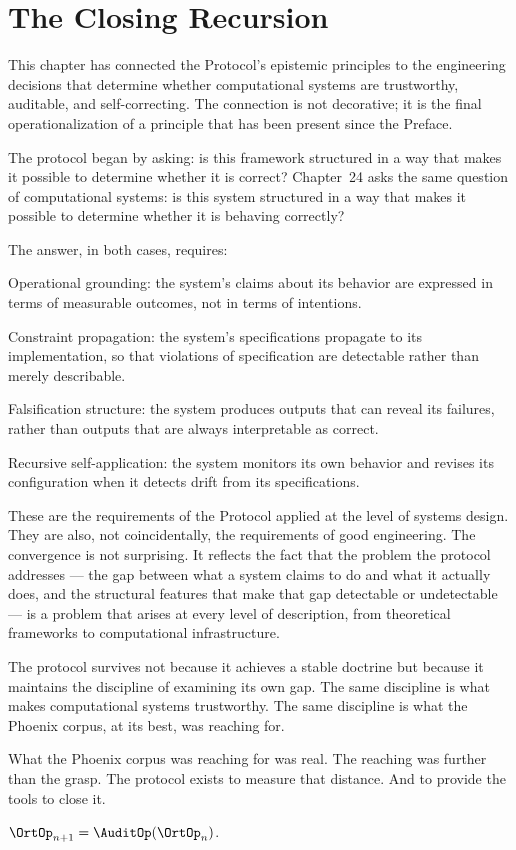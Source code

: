 \section{The Closing Recursion}
\label{sec:closing-recursion}

This chapter has connected the \Ortyx{} Protocol's
epistemic principles to the engineering decisions
that determine whether computational systems are
trustworthy, auditable, and self-correcting. The
connection is not decorative; it is the final
operationalization of a principle that has been
present since the Preface.

The protocol began by asking: is this framework
structured in a way that makes it possible to determine
whether it is correct? Chapter~24 asks the same
question of computational systems: is this system
structured in a way that makes it possible to determine
whether it is behaving correctly?

The answer, in both cases, requires:

Operational grounding: the system's claims about
its behavior are expressed in terms of measurable
outcomes, not in terms of intentions.

Constraint propagation: the system's specifications
propagate to its implementation, so that violations
of specification are detectable rather than merely
describable.

Falsification structure: the system produces outputs
that can reveal its failures, rather than outputs
that are always interpretable as correct.

Recursive self-application: the system monitors its
own behavior and revises its configuration when it
detects drift from its specifications.

These are the requirements of the \Ortyx{} Protocol
applied at the level of systems design. They are
also, not coincidentally, the requirements of good
engineering. The convergence is not surprising. It
reflects the fact that the problem the protocol
addresses --- the gap between what a system claims
to do and what it actually does, and the structural
features that make that gap detectable or undetectable
--- is a problem that arises at every level of
description, from theoretical frameworks to
computational infrastructure.

The protocol survives not because it achieves a stable
doctrine but because it maintains the discipline
of examining its own gap. The same discipline is what
makes computational systems trustworthy. The same
discipline is what the Phoenix corpus, at its best,
was reaching for.

What the Phoenix corpus was reaching for was real.
The reaching was further than the grasp.
The protocol exists to measure that distance.
And to provide the tools to close it.

$\OrtOp_{n+1} = \AuditOp(\OrtOp_n)$.
